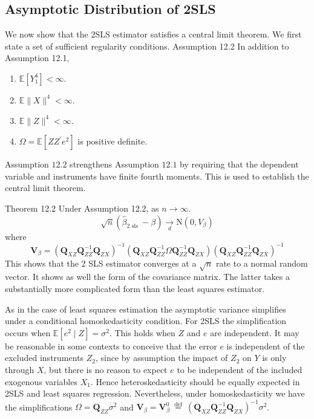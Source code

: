 \documentclass[10pt]{article}
\begin{document}
\subsection{Asymptotic Distribution of 2SLS}
We now show that the 2SLS estimator satisfies a central limit theorem. We first state a set of sufficient regularity conditions. Assumption 12.2 In addition to Assumption 12.1,

\begin{enumerate}
  \item $\mathbb{E}\left[Y_{1}^{4}\right]<\infty$.

  \item $\mathbb{E}\|X\|^{4}<\infty$.

  \item $\mathbb{E}\|Z\|^{4}<\infty$.

  \item $\Omega=\mathbb{E}\left[Z Z^{\prime} e^{2}\right]$ is positive definite.

\end{enumerate}
Assumption $12.2$ strengthens Assumption $12.1$ by requiring that the dependent variable and instruments have finite fourth moments. This is used to establish the central limit theorem.

Theorem 12.2 Under Assumption 12.2, as $n \rightarrow \infty$.
$$
\sqrt{n}\left(\widehat{\beta}_{2 \text { sls }}-\beta\right) \underset{d}{\longrightarrow} \mathrm{N}\left(0, V_{\beta}\right)
$$
where
$$
\boldsymbol{V}_{\beta}=\left(\boldsymbol{Q}_{X Z} \boldsymbol{Q}_{Z Z}^{-1} \boldsymbol{Q}_{Z X}\right)^{-1}\left(\boldsymbol{Q}_{X Z} \boldsymbol{Q}_{Z Z}^{-1} \Omega \boldsymbol{Q}_{Z Z}^{-1} \boldsymbol{Q}_{Z X}\right)\left(\boldsymbol{Q}_{X Z} \boldsymbol{Q}_{Z Z}^{-1} \boldsymbol{Q}_{Z X}\right)^{-1}
$$
This shows that the 2 SLS estimator converges at a $\sqrt{n}$ rate to a normal random vector. It shows as well the form of the covariance matrix. The latter takes a substantially more complicated form than the least squares estimator.

As in the case of least squares estimation the asymptotic variance simplifies under a conditional homoskedasticity condition. For 2SLS the simplification occurs when $\mathbb{E}\left[e^{2} \mid Z\right]=\sigma^{2}$. This holds when $Z$ and $e$ are independent. It may be reasonable in some contexts to conceive that the error $e$ is independent of the excluded instruments $Z_{2}$, since by assumption the impact of $Z_{2}$ on $Y$ is only through $X$, but there is no reason to expect $e$ to be independent of the included exogenous variables $X_{1}$. Hence heteroskedasticity should be equally expected in 2SLS and least squares regression. Nevertheless, under homoskedasticity we have the simplifications $\Omega=\boldsymbol{Q}_{Z Z} \sigma^{2}$ and $\boldsymbol{V}_{\beta}=\boldsymbol{V}_{\beta}^{0} \stackrel{\text { def }}{=}\left(\boldsymbol{Q}_{X Z} \boldsymbol{Q}_{Z Z}^{-1} \boldsymbol{Q}_{Z X}\right)^{-1} \sigma^{2}$.
\end{document}
